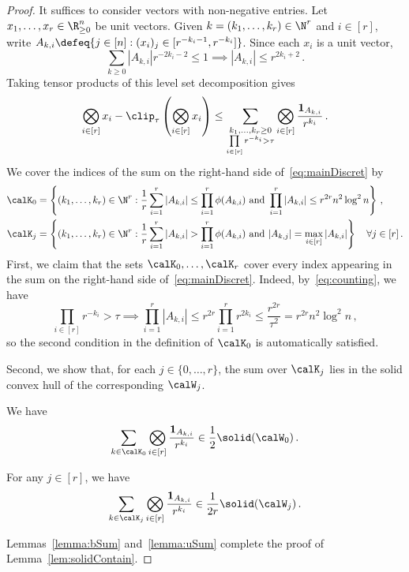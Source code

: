 \documentclass[11pt,a4paper]{article}
\begin{document}
\begin{proof}
    It suffices to consider
    vectors with non-negative entries. Let $x_1, \ldots, x_r\in \R^n_{\ge 0}$ be unit vectors.
    Given
    $k=(k_1, \ldots, k_r)\in\N^r$ and $i\in [r]$, write
    $A_{k,i} \defeq \{j\in [n] : (x_i)_j\in [r^{-k_i-1}, r^{-k_i}]\}$.
    Since each $x_i$ is a unit vector,
    \begin{equation}
        \sum_{k\ge 0} |A_{k,i}| r^{-2k_i-2} \le 1\implies |A_{k,i}|\le r^{2k_i+2}\,.\label{eq:counting}
    \end{equation}
    Taking tensor products of this level set
    decomposition gives
    \begin{equation}
        \bigotimes_{i\in [r]} x_i - \clip_\tau\left(\bigotimes_{i\in [r]} x_i\right)\le \sum_{\substack{k_1, \ldots, k_r\ge 0\\\prod\limits_{i\in [r]}r^{-k_i}>\tau}} \bigotimes_{i\in [r]} \frac{\mathbf 1_{A_{k,i}}}{r^{k_i}}\,.\label{eq:mainDiscret}
    \end{equation}
    We cover the indices of the sum on the right-hand side of~\eqref{eq:mainDiscret} by
    \begin{align*}
        \calK_{0} &= \left\{(k_1, \ldots, k_r)\in \N^r:
        \frac 1r \sum_{i=1}^r |A_{k,i}|\le \prod_{i=1}^r \phi(A_{k,i})\text{ and } \prod_{i=1}^r |A_{k,i}|\le r^{2r} n^2\log^2 n\right\}\,,\\
        \calK_{j} &= \left\{(k_1, \ldots, k_r)\in \N^r : \frac 1r \sum_{i=1}^r |A_{k,i}| > \prod_{i=1}^r \phi(A_{k,i}) \text{ and } |A_{k,j}| = \max_{i\in [r]} |A_{k,i}|\right\}\quad \forall j\in [r]\,.
    \end{align*}
    First, we claim that 
    the sets $\calK_0,\ldots,\calK_r$
    cover every index appearing in the sum on 
    the right-hand side
    of~\eqref{eq:mainDiscret}. Indeed, by~\eqref{eq:counting}, we have
    \[
        \prod_{i\in [r]} r^{-k_i}>\tau \implies \prod_{i=1}^r |A_{k,i}|\le r^{2r} \prod_{i=1}^r r^{2k_i}\le \frac {r^{2r}} {\tau^2} = r^{2r} n^2 \log^2 n\,,
    \]
    so the second condition
    in the definition of $\calK_0$
    is automatically satisfied.

    Second, we show that, for each $j\in \{0, \ldots, r\}$, the sum over $\calK_j$
    lies in the solid convex hull
    of the corresponding $\calW_j$.
    
    \begin{lemma}\label{lemma:bSum}
    We have
    \[
        \sum_{k\in \calK_0} \bigotimes_{i\in [r]} \frac {\mathbf 1_{A_{k,i}}} {r^{k_i}} \in \frac12 \solid(\calW_0)\,.
    \]
    \end{lemma}
    
    \begin{lemma}\label{lemma:uSum}
        For any $j\in [r]$, we have
        \[\sum_{k\in \calK_j} \bigotimes_{i\in [r]} \frac {\mathbf 1_{A_{k,i}}} {r^{k_i}}  \in \frac 1{2r}  \solid(\calW_j)\,.
        \]
    \end{lemma}
    
    \noindent Lemmas~\ref{lemma:bSum}
    and~\ref{lemma:uSum} complete the proof of Lemma~\ref{lem:solidContain}.
\end{proof}
\end{document}
